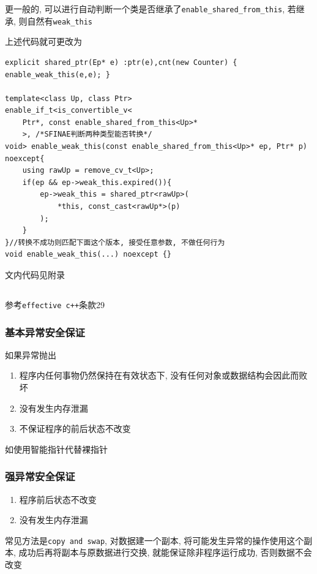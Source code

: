 更一般的, 可以进行自动判断一个类是否继承了{\tt enable\_shared\_from\_this}, 若继承, 则自然有{\tt weak\_this}

上述代码就可更改为
\begin{lstlisting}
explicit shared_ptr(Ep* e) :ptr(e),cnt(new Counter) { enable_weak_this(e,e); }

template<class Up, class Ptr> 
enable_if_t<is_convertible_v<
	Ptr*, const enable_shared_from_this<Up>*
	>, /*SFINAE判断两种类型能否转换*/
void> enable_weak_this(const enable_shared_from_this<Up>* ep, Ptr* p) noexcept{
	using rawUp = remove_cv_t<Up>;
	if(ep && ep->weak_this.expired()){
		ep->weak_this = shared_ptr<rawUp>(
			*this, const_cast<rawUp*>(p)
		);
	} 
}//转换不成功则匹配下面这个版本, 接受任意参数, 不做任何行为	
void enable_weak_this(...) noexcept {}
\end{lstlisting}

文内代码见附录\space{}\space{}

\subsection{\color{purple}{\tt noexcept}}
\label{cpp_c11_exception_safty}
参考{\tt effective c++}条款29
\subsubsection{基本异常安全保证}
如果异常抛出
\begin{enumerate}
	\item 程序内任何事物仍然保持在有效状态下, 没有任何对象或数据结构会因此而败坏
	\item 没有发生内存泄漏
	\item 不保证程序的前后状态不改变
\end{enumerate}

如使用智能指针代替裸指针
\subsubsection{强异常安全保证}
\begin{enumerate}
	\item 程序前后状态不改变
	\item 没有发生内存泄漏
\end{enumerate}

常见方法是{\tt copy and swap}, 对数据建一个副本, 将可能发生异常的操作使用这个副本, 
	成功后再将副本与原数据进行交换, 就能保证除非程序运行成功, 否则数据不会改变

